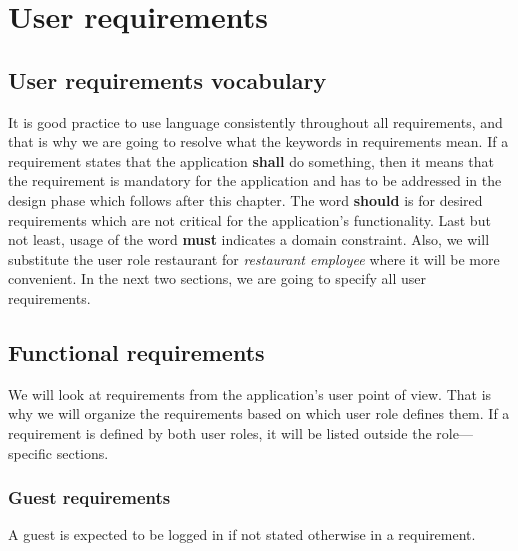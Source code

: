 \section{User requirements}
\subsection{User requirements vocabulary}
It is good practice to use language consistently throughout all requirements, and that is why we are going to resolve what the keywords in requirements mean.
If a requirement states that the application \textbf{shall} do something, then it means that the requirement is mandatory for the application and has to be addressed in the design phase which follows after this chapter. 
The word \textbf{should} is for desired requirements which are not critical for the application's functionality.
Last but not least, usage of the word \textbf{must} indicates a domain constraint.
Also, we will substitute the user role restaurant for \emph{restaurant employee} where it will be more convenient.
In the next two sections, we are going to specify all user requirements. 

\subsection{Functional requirements}
We will look at requirements from the application's user point of view.
That is why we will organize the requirements based on which user role defines them.
If a requirement is defined by both user roles, it will be listed outside the role---specific sections.

\subsubsection{Guest requirements}
A guest is expected to be logged in if not stated otherwise in a requirement.

